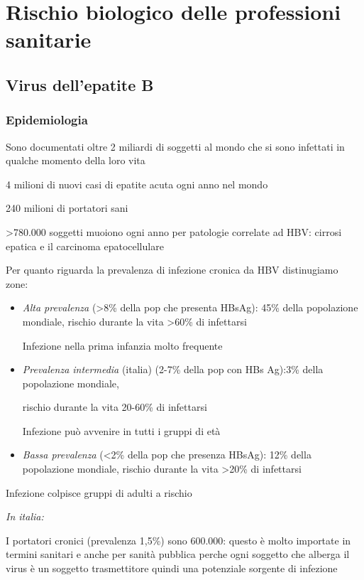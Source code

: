 \section{Rischio biologico delle professioni sanitarie}

\subsection{Virus dell'epatite B}

\subsubsection{Epidemiologia}

  Sono documentati oltre 2 miliardi di soggetti al mondo che si sono
  infettati in qualche momento della loro vita

  4 milioni di nuovi casi di epatite acuta ogni anno nel mondo

  240 milioni di portatori sani

  >780.000 soggetti muoiono ogni anno per patologie
  correlate ad HBV: cirrosi epatica e il carcinoma epatocellulare

  Per quanto riguarda la prevalenza di infezione cronica da HBV
  distinugiamo zone:

\begin{itemize}
\item
  \emph{Alta prevalenza} (>8\% della pop che presenta
  HBsAg): 45\% della popolazione mondiale, rischio durante la vita
  >60\% di infettarsi

  Infezione nella prima infanzia molto frequente
\item
  \emph{Prevalenza intermedia} (italia) (2-7\% della pop con HBs Ag):3\%
  della popolazione mondiale,

  rischio durante la vita 20-60\% di infettarsi

  Infezione può avvenire in tutti i gruppi di età
\item
  \emph{Bassa prevalenza} (<2\% della pop che presenza HBsAg):
  12\% della popolazione mondiale, rischio durante la vita
  >20\% di infettarsi
\end{itemize}
  Infezione colpisce gruppi di adulti a rischio

  \emph{\emph{In italia:}}

  I portatori cronici (prevalenza 1,5\%) sono 600.000: questo è molto
  importate in termini sanitari e anche per sanità pubblica perche ogni
  soggetto che alberga il virus è un soggetto trasmettitore quindi una
  potenziale sorgente di infezione

